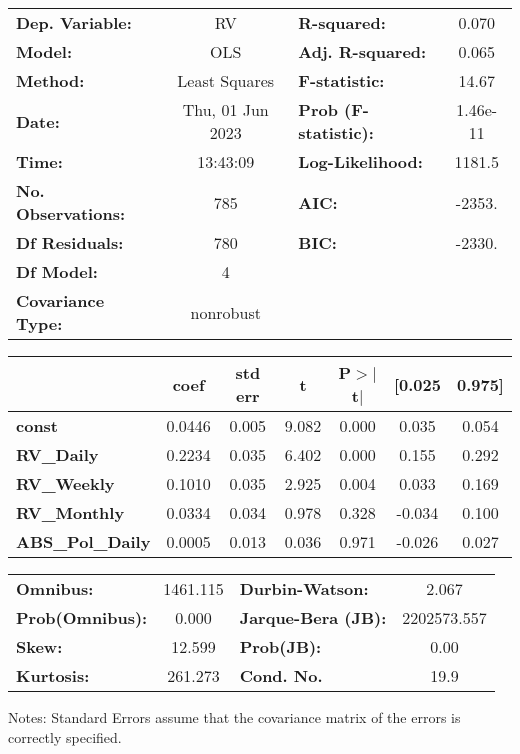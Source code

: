 \begin{center}
\begin{tabular}{lclc}
\toprule
\textbf{Dep. Variable:}    &        RV        & \textbf{  R-squared:         } &      0.070   \\
\textbf{Model:}            &       OLS        & \textbf{  Adj. R-squared:    } &      0.065   \\
\textbf{Method:}           &  Least Squares   & \textbf{  F-statistic:       } &      14.67   \\
\textbf{Date:}             & Thu, 01 Jun 2023 & \textbf{  Prob (F-statistic):} &   1.46e-11   \\
\textbf{Time:}             &     13:43:09     & \textbf{  Log-Likelihood:    } &     1181.5   \\
\textbf{No. Observations:} &         785      & \textbf{  AIC:               } &     -2353.   \\
\textbf{Df Residuals:}     &         780      & \textbf{  BIC:               } &     -2330.   \\
\textbf{Df Model:}         &           4      & \textbf{                     } &              \\
\textbf{Covariance Type:}  &    nonrobust     & \textbf{                     } &              \\
\bottomrule
\end{tabular}
\begin{tabular}{lcccccc}
                         & \textbf{coef} & \textbf{std err} & \textbf{t} & \textbf{P$> |$t$|$} & \textbf{[0.025} & \textbf{0.975]}  \\
\midrule
\textbf{const}           &       0.0446  &        0.005     &     9.082  &         0.000        &        0.035    &        0.054     \\
\textbf{RV\_Daily}       &       0.2234  &        0.035     &     6.402  &         0.000        &        0.155    &        0.292     \\
\textbf{RV\_Weekly}      &       0.1010  &        0.035     &     2.925  &         0.004        &        0.033    &        0.169     \\
\textbf{RV\_Monthly}     &       0.0334  &        0.034     &     0.978  &         0.328        &       -0.034    &        0.100     \\
\textbf{ABS\_Pol\_Daily} &       0.0005  &        0.013     &     0.036  &         0.971        &       -0.026    &        0.027     \\
\bottomrule
\end{tabular}
\begin{tabular}{lclc}
\textbf{Omnibus:}       & 1461.115 & \textbf{  Durbin-Watson:     } &      2.067   \\
\textbf{Prob(Omnibus):} &   0.000  & \textbf{  Jarque-Bera (JB):  } & 2202573.557  \\
\textbf{Skew:}          &  12.599  & \textbf{  Prob(JB):          } &       0.00   \\
\textbf{Kurtosis:}      & 261.273  & \textbf{  Cond. No.          } &       19.9   \\
\bottomrule
\end{tabular}
\end{center}

Notes: \newline
 [1] Standard Errors assume that the covariance matrix of the errors is correctly specified.
